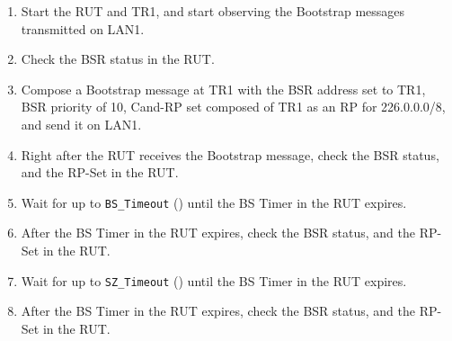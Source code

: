 \documentclass[11pt]{report}
\begin{document}
\begin{enumerate}

  \item Start the RUT and TR1, and start observing the Bootstrap messages
  transmitted on LAN1.

  \item Check the BSR status in the RUT.

  \item Compose a Bootstrap message at TR1 with the BSR address set to TR1,
  BSR priority of 10, Cand-RP set composed of TR1 as an RP for 226.0.0.0/8,
  and send it on LAN1.

  \item Right after the RUT receives the Bootstrap message, check the BSR
  status, and the RP-Set in the RUT.

  \item Wait for up to \verb=BS_Timeout= ({\PimsmBSTimeout}) until the BS
  Timer in the RUT expires.

  \item After the BS Timer in the RUT expires, check the BSR status, and the
  RP-Set in the RUT.

  \item Wait for up to \verb=SZ_Timeout= ({\PimsmSZTimeout}) until the BS
  Timer in the RUT expires.

  \item After the BS Timer in the RUT expires, check the BSR status, and the
  RP-Set in the RUT.

\end{enumerate}


\end{document}
